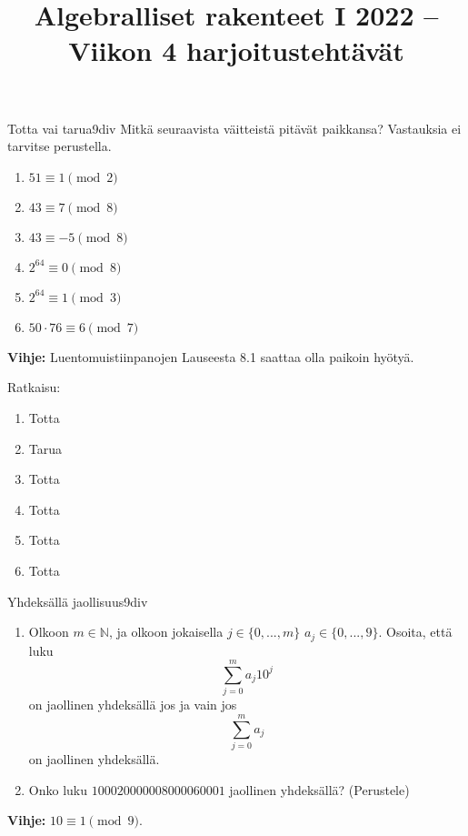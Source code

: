 \documentclass[11pt,a4paper]{amsart}
\title{Algebralliset rakenteet I 2022 -- Viikon 4 harjoitustehtävät}
\newcommand{\N}{\mathbb{N}}
\newcommand{\1}{\mathbf{1}}
\begin{document}
\maketitle

\begin{Exercises}{Totta vai tarua}{9div}
	Mitkä seuraavista väitteistä pitävät paikkansa? Vastauksia ei tarvitse perustella.
	\begin{enumerate}
		\item $51 \equiv 1\pmod{2}$
		\item $43\equiv 7\pmod{8}$
		\item $43\equiv -5\pmod{8}$
		\item $2^{64}\equiv 0\pmod{8}$
		\item $2^{64}\equiv 1\pmod{3}$
		\item $50\cdot 76\equiv 6\pmod{7}$
	\end{enumerate}
	{\bf Vihje:} Luentomuistiinpanojen Lauseesta 8.1 saattaa olla paikoin hyötyä.
\end{Exercises}

\begin{Solution}{Ratkaisu:}
	\begin{enumerate}
		\item Totta
		\item Tarua
		\item Totta
		\item Totta
		\item Totta
		\item Totta
	\end{enumerate}
\end{Solution}

\begin{Exercises}{Yhdeksällä jaollisuus}{9div}
	\begin{enumerate}
		\item Olkoon $m\in \N$, ja olkoon jokaisella $j\in \{0,...,m\}$ $a_j\in \{0,...,9\}$. Osoita, että luku
		      \[
			      \sum_{j=0}^m a_j 10^j
		      \]
		      on jaollinen yhdeksällä jos ja vain jos
		      \[
			      \sum_{j=0}^m a_j
		      \]
		      on jaollinen yhdeksällä.
		\item Onko luku $100020000008000060001$ jaollinen yhdeksällä? (Perustele)
	\end{enumerate}
	{\bf Vihje:} $10\equiv 1\pmod{9}$.
\end{Exercises}
\end{document}
